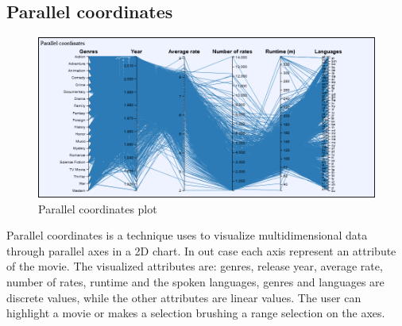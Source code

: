 \documentclass[]{article}
\begin{document}
\subsection{Parallel coordinates}
\begin{figure}[H]
	\centering
	\includegraphics[width=1\linewidth]{images/parallel_plot}
	\caption{Parallel coordinates plot}
	\label{fig:parallelplot}
\end{figure}
Parallel coordinates is a technique uses to visualize multidimensional data through parallel axes in a 2D chart. In out case each axis represent an attribute of the movie.\newline
The visualized attributes are: genres, release year, average rate, number of rates, runtime and the spoken languages, genres and languages are discrete values, while the other attributes are linear values.\newline
The user can highlight a movie or makes a selection brushing a range selection on the axes.
\end{document}
